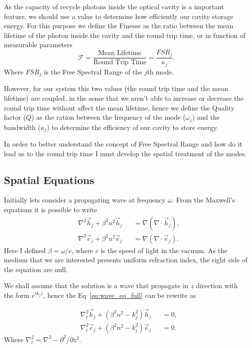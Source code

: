 As the capacity of recycle photons inside the optical cavity is a important feature, we should use a value to determine how efficiently our cavity storage energy. For this purpose we define the Finesse as the ratio between the mean lifetime of the photon inside the cavity and the round trip time, or in function of measurable parameters 
\begin{equation}
    \mathcal{F} = \frac{\text{Mean Lifetime}}{\text{Round Trip Time}} = \frac{FSR_j}{\kappa_j}.
\end{equation}
Where $FSR_j$ is the Free Spectral Range of the $j$th mode.

However, for our system this two values (the round trip time and the mean lifetime) are coupled, in the sense that we aren't able to increase or decrease the round trip time without affect the mean lifetime, hence we define the Quality factor ($Q$) as the ration between the frequency of the mode ($\omega_j$) and the bandwidth ($\kappa_j$) to determine the efficiency of our cavity to store energy. 

In order to better understand the concept of Free Spectral Range and how do it lead us to the round trip time I must develop the spatial treatment of the modes. 

\subsection{Spatial Equations}

Initially lets consider a propagating wave at frequency $\omega$. From the Maxwell's equations it is possible to write
\begin{subequations}
    \begin{alignat}{2}
    &\nabla^2\vec{h}_j+\beta^2n^2\vec{h}_j &&= \nabla(\nabla\cdot\vec{h}_j),\\
    &\nabla^2\vec{e}_j+\beta^2n^2\vec{e}_j &&= \nabla(\nabla\cdot\vec{e}_j).
    \end{alignat}
    \label{eq:wave_eq_full}
\end{subequations}
Here I defined $\beta = \omega/c$, where $c$ is the speed of light in the vacuum. As the medium that we are interested presents uniform refraction index, the right side of the equation are null. 

We shall assume that the solution is a wave that propagate in $z$ direction with the form $e^{ik_jz}$, hence the Eq~\ref{eq:wave_eq_full} can be rewrite as 

\begin{subequations}
    \begin{alignat}{2}
    &\nabla_t^2\vec{h}_j+(\beta^2n^2-k_j^2)\vec{h}_j &&=0,\\
    &\nabla_t^2\vec{e}_j+(\beta^2n^2-k_j^2)\vec{e}_j &&=0.
    \end{alignat}
    \label{eq:wave_eq}
\end{subequations}
Where $\nabla_t^2 = \nabla^2 - \partial^2/\partial z^2$.

